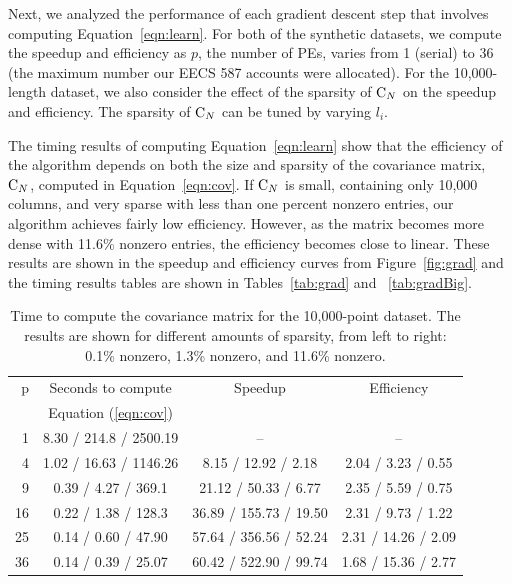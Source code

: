 Next, we analyzed the performance of each gradient descent step that involves computing
Equation~\ref{eqn:learn}.  For both of the synthetic datasets, we compute the speedup and
efficiency as $p$, the number of \acp{PE}, varies from 1 (serial) to 36 (the maximum
number our EECS 587 accounts were allocated).  For the 10,000-length dataset, we also
consider the effect of the sparsity of $\mathrm{C}_N$ on the speedup and efficiency.  The
sparsity of $\mathrm{C}_N$ can be tuned by varying $l_i$.

The timing results of computing Equation~\ref{eqn:learn} show that the efficiency of the
algorithm depends on both the size and sparsity of the covariance matrix, $\mathrm{C}_N$,
computed in Equation~\ref{eqn:cov}.  If $\mathrm{C}_N$ is small, containing only 10,000
columns, and very sparse with less than one percent nonzero entries, our algorithm
achieves fairly low efficiency.  However, as the matrix becomes more dense with 11.6\%
nonzero entries, the efficiency becomes close to linear.  These results are shown in the
speedup and efficiency curves from Figure~\ref{fig:grad} and the timing results tables are
shown in Tables~\ref{tab:grad} and ~\ref{tab:gradBig}.

\begin{table}
  \begin{center}
    \begin{tabular}{|r|c|c|c|}
      \hline
      p & Seconds to compute & Speedup & Efficiency \\
      & Equation (\ref{eqn:cov}) &  &  \\
      \hline
      1 & 8.30 / 214.8 / 2500.19 & -- & -- \\
      4 & 1.02 / 16.63 / 1146.26 & 8.15 / 12.92 / 2.18 & 2.04 / 3.23 / 0.55 \\
      9 & 0.39 / 4.27 / 369.1 & 21.12 / 50.33 / 6.77 & 2.35 / 5.59 / 0.75 \\
      16 & 0.22 / 1.38 / 128.3 & 36.89 / 155.73 / 19.50 & 2.31 / 9.73 / 1.22 \\
      25 & 0.14 / 0.60 / 47.90 & 57.64 / 356.56 / 52.24 & 2.31 / 14.26 / 2.09 \\
      36 & 0.14 / 0.39 / 25.07 & 60.42 / 522.90 / 99.74 & 1.68 / 15.36 / 2.77 \\
      \hline
    \end{tabular}
    \caption {{\small Time to compute the covariance matrix for the 10,000-point dataset.
        The results are shown for different amounts of sparsity, from left to right: 0.1\%
        nonzero, 1.3\% nonzero, and 11.6\% nonzero.  }}
    \label{tab:Ksmall}
  \end{center}
\end{table}

